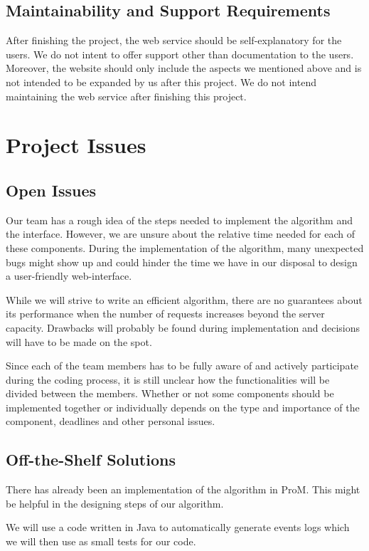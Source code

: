 \documentclass[notitlepage]{article}
\begin{document}
\begin{flushleft}
\subsection{Maintainability and Support Requirements}
After finishing the project, the web service should be self-explanatory for the users. We do not intent to offer support other than documentation to the users. Moreover, the website should only include the aspects we mentioned above and is not intended to be expanded by us after this project. We do not intend maintaining the web service after finishing this project.
\section{Project Issues}

\subsection{Open Issues}
Our team has a rough idea of the steps needed to implement the algorithm and the interface.
However, we are unsure about the relative time needed for each of these components.
During the implementation of the algorithm, many unexpected bugs might show up and could hinder the time we have in our disposal to design a user-friendly web-interface.

While we will strive to write an efficient algorithm, there are no guarantees about its  performance when the number of requests increases beyond the server capacity. Drawbacks will probably be found during implementation and decisions will have to be made on the spot.

Since each of the team members has to be fully aware of and actively participate during the coding process, it is still unclear how the functionalities will be divided between the members.
Whether or not some components should be implemented together or individually depends on the type and importance of the component, deadlines and other personal issues.


\subsection{Off-the-Shelf Solutions}
There has already been an implementation of the algorithm in ProM.
This might be helpful in the designing steps of our algorithm.

We will use a code written in Java to automatically generate events logs which we will then use as small tests for our code.


\end{flushleft}
\end{document}
